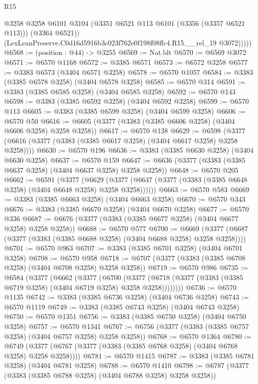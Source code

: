 \begin{lexlean}{R15}
\begin{coremodule}
              @3258
              @3258
              @6101
              @3104
              (@3351 @6521 @113 @6101 (@3356 (@3357 @6521 @113)))
              (@3364 @6521))
            (LexLeanPreserve.C0d16d5916b3c023f762e0f198f08ffc4.R15.__rel_19 @3072)))))
@6568 := (position : @44) -> @3255
@6569 := Nat.blt
@6570 := @6569 @3072
@6571 := @6570 @1168
@6572 := @3385 @6571
@6573 := @6572 @3258
@6577 := @3383 @6573 (@3404 @6571 @3258)
@6578 := @6570 @1057
@6584 := @3383 (@3385 @6578 @3258) (@3404 @6578 @3258)
@6585 := @6570 @314
@6591 := @3383 (@3385 @6585 @3258) (@3404 @6585 @3258)
@6592 := @6570 @143
@6598 := @3383 (@3385 @6592 @3258) (@3404 @6592 @3258)
@6599 := @6570 @113
@6605 := @3383 (@3385 @6599 @3258) (@3404 @6599 @3258)
@6606 := @6570 @50
@6616 := @6605 (@3377 (@3383 (@3385 @6606 @3258) (@3404 @6606 @3258) @3258 @3258))
@6617 := @6570 @138
@6629 := @6598 (@3377 (@6616 (@3377 (@3383 (@3385 @6617 @3258) (@3404 @6617 @3258) @3258 @3258))))
@6630 := @6570 @196
@6636 := @3383 (@3385 @6630 @3258) (@3404 @6630 @3258)
@6637 := @6570 @159
@6647 := @6636 (@3377 (@3383 (@3385 @6637 @3258) (@3404 @6637 @3258) @3258 @3258))
@6648 := @6570 @205
@6662 := @6591
    (@3377
      (@6629 (@3377 (@6647 (@3377 (@3383 (@3385 @6648 @3258) (@3404 @6648 @3258) @3258 @3258))))))
@6663 := @6570 @583
@6669 := @3383 (@3385 @6663 @3258) (@3404 @6663 @3258)
@6670 := @6570 @343
@6676 := @3383 (@3385 @6670 @3258) (@3404 @6670 @3258)
@6677 := @6570 @336
@6687 := @6676 (@3377 (@3383 (@3385 @6677 @3258) (@3404 @6677 @3258) @3258 @3258))
@6688 := @6570 @577
@6700 := @6669 (@3377 (@6687 (@3377 (@3383 (@3385 @6688 @3258) (@3404 @6688 @3258) @3258 @3258))))
@6701 := @6570 @963
@6707 := @3383 (@3385 @6701 @3258) (@3404 @6701 @3258)
@6708 := @6570 @958
@6718 := @6707 (@3377 (@3383 (@3385 @6708 @3258) (@3404 @6708 @3258) @3258 @3258))
@6719 := @6570 @986
@6735 := @6584
    (@3377
      (@6662
        (@3377
          (@6700
            (@3377 (@6718 (@3377 (@3383 (@3385 @6719 @3258) (@3404 @6719 @3258) @3258 @3258))))))))
@6736 := @6570 @1135
@6742 := @3383 (@3385 @6736 @3258) (@3404 @6736 @3258)
@6743 := @6570 @1119
@6749 := @3383 (@3385 @6743 @3258) (@3404 @6743 @3258)
@6750 := @6570 @1351
@6756 := @3383 (@3385 @6750 @3258) (@3404 @6750 @3258)
@6757 := @6570 @1341
@6767 := @6756 (@3377 (@3383 (@3385 @6757 @3258) (@3404 @6757 @3258) @3258 @3258))
@6768 := @6570 @1364
@6780 := @6749 (@3377 (@6767 (@3377 (@3383 (@3385 @6768 @3258) (@3404 @6768 @3258) @3258 @3258))))
@6781 := @6570 @1415
@6787 := @3383 (@3385 @6781 @3258) (@3404 @6781 @3258)
@6788 := @6570 @1410
@6798 := @6787 (@3377 (@3383 (@3385 @6788 @3258) (@3404 @6788 @3258) @3258 @3258))

\end{coremodule}
\end{lexlean}
